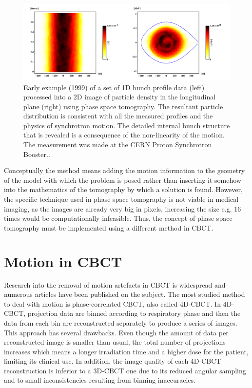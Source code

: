 \begin{figure}

\begin{center} 

\includegraphics[width=\linewidth]{StateOfArt/Tosca2016fig.png} 

\caption[Phase space tomography]{\label{fig:PST} Early example (1999) of a set of 1D bunch profile data (left) processed into a 2D image of particle density in the longitudinal plane (right) using phase space tomography.  The resultant particle distribution is consistent with all the measured profiles and the physics of synchrotron motion.  The detailed internal bunch structure that is revealed is a consequence of the non-linearity of the motion.  The measurement was made at the CERN Proton Synchrotron Booster.\cite{pstweb}.} 
\end{center} 
\end{figure}


 Conceptually the method means adding the motion information to the geometry of the model with which the problem is posed rather than inserting it somehow into the mathematics of the tomography by which a solution is found. However, the specific technique used in phase space tomography is not viable in medical imaging, as the images are already very big in pixels, increasing the size e.g. 16 times would be computationally infeasible. Thus, the concept of phase space tomography must be implemented using a different method in CBCT.

\section{Motion in CBCT}
 Research into the removal of motion artefacts in CBCT is widespread and numerous articles have been published on the subject.  The most studied method to deal with motion is phase-correlated CBCT, also called 4D-CBCT\cite{sonke2005respiratory}\cite{thomas2006}\cite{li2006four}\cite{Pengpan2012246}\cite{t2016first}.  In 4D-CBCT, projection data are binned according to respiratory phase and then the data from each bin are reconstructed separately to produce a series of images.  This approach has several drawbacks.  Even though the amount of data per reconstructed image is smaller than usual, the total number of projections increases which means a longer irradiation time and a higher dose for the patient, limiting its clinical use.  In addition, the image quality of each 4D-CBCT reconstruction is inferior to a 3D-CBCT one due to its reduced angular sampling and to small inconsistencies resulting from binning inaccuracies. 

